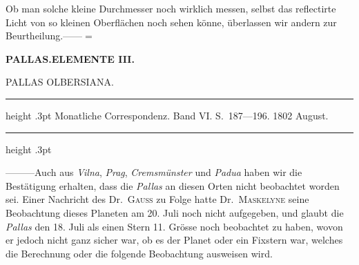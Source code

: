 Ob man solche kleine Durchmesser noch wirklich messen, selbst das reflectirte Licht von so kleinen Oberflächen noch sehen könne, überlassen wir andern zur Beurtheilung.\quad —\quad —\quad $=$
\begin{flushright}\end{flushright}
\clearpage
\thispagestyle{empty}
\noindent{}%
\makebox[12mm][l]{}%
\parbox[t]{\dimexpr\linewidth-24mm\relax}{\centering\footnotesize\bfseries PALLAS.\enspace ELEMENTE III.\par}%
\par\nobreak\medskip
{}
\begin{center}\large PALLAS OLBERSIANA.\end{center}
\begin{center}
\parbox{.75\linewidth}{%
  \centering\fontsize{8.2}{10.2}\selectfont
  \hrule height .3pt\relax\vspace{2.5pt}
  Monatliche Correspondenz. Band VI. S.\ 187—196. 1802 August.\par
  \vspace{2.5pt}\hrule height .3pt\relax
}
\end{center}
\par\indent —\quad —\quad —\quad Auch aus \textit{Vilna}, \textit{Prag}, \textit{Cremsmünster} und \textit{Padua} haben wir die Bestätigung erhalten, dass die \textit{Pallas} an diesen Orten nicht beobachtet worden sei. Einer Nachricht des Dr.\ \textsc{Gauss} zu Folge hatte Dr.\ \textsc{Maskelyne} seine Beobachtung dieses Planeten am 20. Juli noch nicht aufgegeben, und glaubt die \textit{Pallas} den 18. Juli als einen Stern 11. Grösse noch beobachtet zu haben, wovon er jedoch nicht ganz sicher war, ob es der Planet oder ein Fixstern war, welches die Berechnung oder die folgende Beobachtung ausweisen wird.

